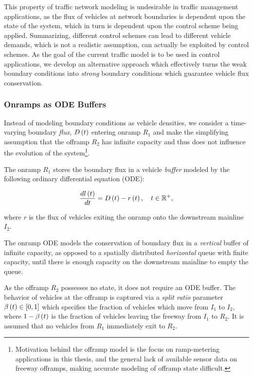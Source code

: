 This property of traffic network modeling is undesirable in traffic management applications, as the flux of vehicles at network boundaries is dependent upon the state of the system, which in turn is dependent upon the control scheme being applied. Summarizing, different control schemes can lead to different vehicle demands, which is not a realistic assumption, can actually be exploited by control schemes. As the goal of the current traffic model is to be used in control applications, we develop an alternative approach which effectively turns the weak boundary conditions into \emph{strong} boundary conditions which guarantee vehicle flux conservation.

\subsubsection{Onramps as ODE Buffers}

Instead of modeling boundary conditions as vehicle densities, we consider a time-varying boundary \emph{flux}, $D\left(t\right)$ entering onramp $R_1$ and make the simplifying assumption that the offramp $R_2$ has infinite capacity and thus does not influence the evolution of the system\footnote{Motivation behind the offramp model is the focus on ramp-metering applications in this thesis, and the general lack of available sensor data on freeway offramps, making accurate modeling of offramp state difficult.}.

The onramp $R_1$ stores the boundary flux in a vehicle \emph{buffer} modeled by the following ordinary differential equation (ODE):

\begin{equation}
\label{eqn:ode-buffer}
\frac{dl\left(t\right)}{dt} = D\left(t\right) - r\left(t\right),\quad t\in \mathbb{R}^+,
\end{equation}

where $r$ is the flux of vehicles exiting the onramp onto the downstream mainline $I_2$.

The onramp ODE models the conservation of boundary flux in a \emph{vertical} buffer of infinite capacity, as opposed to a spatially distributed \emph{horizontal} queue with finite capacity, until there is enough capacity on the downstream mainline to empty the queue.

As the offramp $R_2$ possesses no state, it does not require an ODE buffer. The behavior of vehicles at the offramp is captured via a \emph{split ratio} parameter $\beta \left(t\right) \in \left[0,1\right]$ which specifies the fraction of vehicles which move from $I_1$ to $I_2$, where $1 - \beta\left(t\right)$ is the fraction of vehicles leaving the freeway from $I_1$ to $R_2$. It is assumed that no vehicles from $R_1$ immediately exit to $R_2$.

